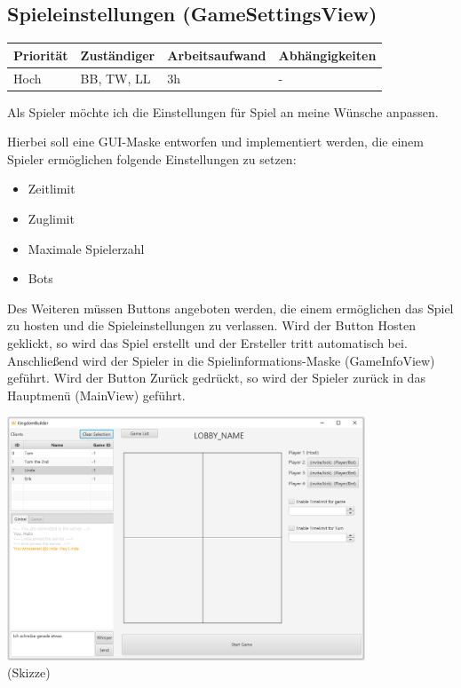 \documentclass[a4paper]{scrreprt}
\newenvironment{requirement}[5] {
	\subsection{#1}
	\begin{tabularx}{\textwidth}{|X|l|X|X|}
		\hline
		Priorität & Zuständiger & Arbeitsaufwand & Abhängigkeiten \\
		\hline
		#2 & #3 & #4 & #5 \\
		\hline
	\end{tabularx}
	}{
	\newpage
	}
\begin{document}
\begin{requirement}{Spieleinstellungen (GameSettingsView)}{Hoch}{BB, TW, LL}{3h}{-}

\begin{center}
	Als Spieler möchte ich die Einstellungen für Spiel an meine Wünsche anpassen.
\end{center}

Hierbei soll eine GUI-Maske entworfen und implementiert werden, die einem Spieler ermöglichen folgende Einstellungen zu setzen:

\begin{itemize}
	\item Zeitlimit
	\item Zuglimit
	\item Maximale Spielerzahl
	\item Bots
\end{itemize}

Des Weiteren müssen Buttons angeboten werden, die einem ermöglichen das Spiel zu \glqq hosten\grqq{} und die Spieleinstellungen zu verlassen.
Wird der Button \glqq
Hosten\grqq{} geklickt, so wird das Spiel erstellt und der Ersteller tritt automatisch bei. Anschließend wird der Spieler in die Spielinformations-Maske (\glqq GameInfoView\grqq{}) geführt. Wird der Button \glqq Zurück\grqq{} gedrückt, so wird der Spieler zurück in das Hauptmenü (\glqq MainView\grqq{}) geführt.

\begin{center}
	\includegraphics[width=0.8\textwidth]{view4.png}
	\\
	\tiny{(Skizze)}
\end{center}

\end{requirement}
\end{document}
